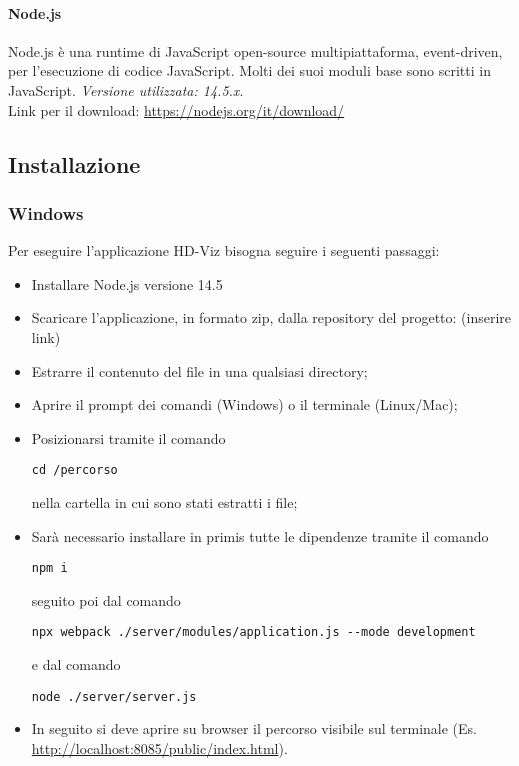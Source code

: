 \documentclass[../manuale_sviluppatore.tex]{subfiles}
\begin{document}
\paragraph{Node.js}
    \label{par:node}
Node.js è una runtime di JavaScript open-source multipiattaforma, event-driven, per l’esecuzione di codice JavaScript. Molti dei suoi moduli base sono scritti in JavaScript. 
\emph{Versione utilizzata: 14.5.x}.\\
Link per il download: \url{https://nodejs.org/it/download/}

\subsection{Installazione}
    \label{sub:inst}
\subsubsection{Windows}
    \label{subsub:wind_inst}

Per eseguire l’applicazione HD-Viz bisogna seguire i seguenti passaggi:
\begin{itemize}
\item Installare Node.js versione 14.5
\item Scaricare l’applicazione, in formato zip, dalla repository del progetto: (inserire link)
\item Estrarre il contenuto del file in una qualsiasi directory; 
\item Aprire il prompt dei comandi (Windows) o il terminale (Linux/Mac); 
\item Posizionarsi tramite il comando  \begin{center} \verb|cd /percorso| \end{center} nella cartella in cui sono stati estratti i file;
\item Sarà necessario installare in primis tutte le dipendenze tramite il comando \begin{center} \verb|npm i| \end{center} seguito poi dal comando \begin{center}\verb|npx webpack ./server/modules/application.js --mode development|\end{center} e dal comando \begin{center}\verb|node ./server/server.js| \end{center}
\item In seguito si deve aprire su browser il percorso visibile sul terminale (Es. \url{http://localhost:8085/public/index.html}).
\end{itemize}
\end{document}

